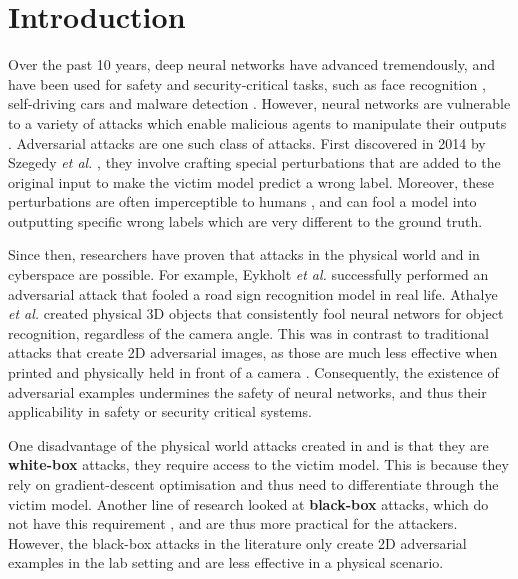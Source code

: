 \chapter{Introduction}
	\label{chap:intro}

Over the past 10 years, deep neural networks have advanced tremendously, and have been used for safety and security-critical tasks, such as face recognition \cite{face_recognition}, self-driving cars \cite{self_driving_cars} and malware detection \cite{malware_detection}. However, neural networks are vulnerable to a variety of attacks which enable malicious agents to manipulate their outputs \cite{deep_leakage, trojan_attacks, poisoning_attacks, szegedy2014intriguing}. Adversarial attacks are one such class of attacks. First discovered in 2014 by Szegedy \textit{et al.} \cite{szegedy2014intriguing}, they involve crafting special perturbations that are added to the original input to make the victim model predict a wrong label. Moreover, these perturbations are often imperceptible to humans \cite{szegedy2014intriguing}, and can fool a model into outputting specific wrong labels which are very different to the ground truth.

Since then, researchers have proven that attacks in the physical world \cite{evtimov_road_signs} and in cyberspace \cite{papernot_cyberspace_attack} are possible. For example, Eykholt \textit{et al.} \cite{evtimov_road_signs} successfully performed an adversarial attack that fooled a road sign recognition model in real life. Athalye \textit{et al.} \cite{athalye} created physical 3D objects that consistently fool neural networs for object recognition, regardless of the camera angle. This was in contrast to traditional attacks that create 2D adversarial images, as those are much less effective when printed and physically held in front of a camera \cite{lu_physical_experiments}. Consequently, the existence of adversarial examples undermines the safety of neural networks, and thus their applicability in safety or security critical systems.

One disadvantage of the physical world attacks created in \cite{athalye} and \cite{evtimov_road_signs} is that they are \textbf{white-box} attacks, they require access to the victim model. This is because they rely on gradient-descent optimisation and thus need to differentiate through the victim model. Another line of research looked at \textbf{black-box} attacks, which do not have this requirement \cite{akhtar}, and are thus more practical for the attackers. However, the black-box attacks in the literature only create 2D adversarial examples in the lab setting and are less effective in a physical scenario.

